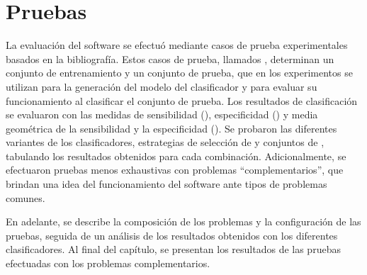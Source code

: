 %
%
%
%
\setcounter{chapter}{3}
%
\chapter{Pruebas}
%
La evaluación del software se efectuó mediante casos de prueba
experimentales basados en la bibliografía.
Estos casos de prueba, llamados , determinan un conjunto
de entrenamiento y un conjunto de prueba, que en los experimentos se
utilizan para la generación del modelo del clasificador y para evaluar
su funcionamiento al clasificar el conjunto de prueba.
Los resultados de clasificación se evaluaron con las medidas de
sensibilidad (\SE), especificidad (\SP) y media geométrica de la
sensibilidad y la especificidad (\GM).
Se probaron las diferentes variantes de los clasificadores,
estrategias de selección de  y conjuntos de ,
tabulando los resultados obtenidos para cada combinación.
Adicionalmente, se efectuaron pruebas menos exhaustivas con problemas
``complementarios'', que brindan una idea del funcionamiento del
software ante tipos de problemas comunes.

En adelante, se describe la composición de los problemas y la
configuración de las pruebas, seguida de un análisis de los resultados
obtenidos con los diferentes clasificadores.
Al final del capítulo, se presentan los resultados de las pruebas
efectuadas con los problemas complementarios.
